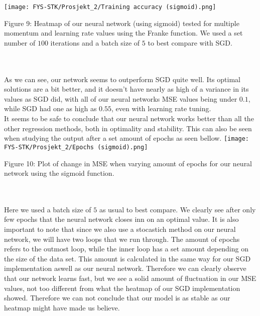 \documentclass[english,notitlepage,reprint,nofootinbib]{revtex4-1}  %
\begin{document}
\texttt{[image: FYS-STK/Prosjekt\_2/Training accuracy (sigmoid).png]}
\caption{Figure 9: Heatmap of our neural network (using sigmoid) tested for multiple momentum and learning rate values using the Franke function. We used a set number of $100$ iterations and a batch size of $5$ to best compare with SGD.}
\\
\\
As we can see, our network seems to outperform SGD quite well. Its optimal solutions are a bit better, and it doesn't have nearly as high of a variance in its values as SGD did, with all of our neural networks MSE values being under $0.1$, while SGD had one as high as $0.55$, even with learning rate tuning.
\\
It seems to be safe to conclude that our neural network works better than all the other regression methods, both in optimality and stability. This can also be seen when studying the output after a set amount of epochs as seen bellow.
\texttt{[image: FYS-STK/Prosjekt\_2/Epochs (sigmoid).png]}
\caption{Figure 10: Plot of change in MSE when varying amount of epochs for our neural network using the sigmoid function.}
\\
\\
Here we used a batch size of $5$ as usual to best compare. We clearly see after only few epochs that the neural network closes inn on an optimal value. It is also important to note that since we also use a stocastich method on our neural network, we will have two loops that we run through. The amount of epochs refers to the outmost loop, while the inner loop has a set amount depending on the size of the data set. This amount is calculated in the same way for our SGD implementation aswell as our neural network. Therefore we can clearly observe that our network learns fast, but we see a solid amount of fluctuation in our MSE values, not too different from what the heatmap of our SGD implementation showed. Therefore we can not conclude that our model is as stable as our heatmap might have made us believe. 
\end{document}
